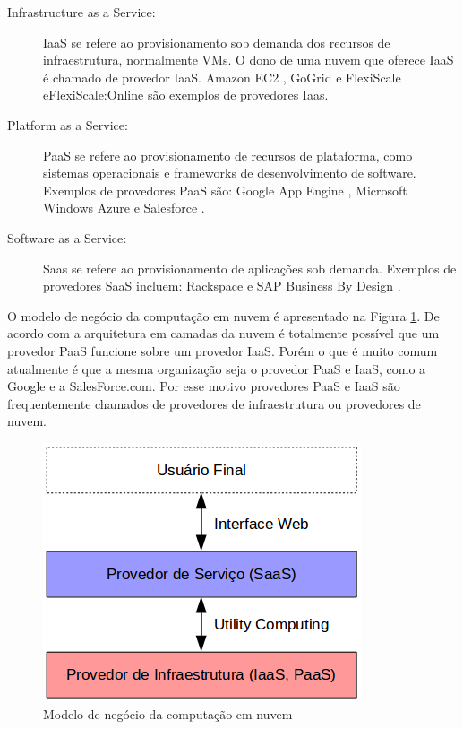 \begin{description}

\item[Infrastructure as a Service:] IaaS se refere ao provisionamento sob demanda dos recursos de infraestrutura, normalmente VMs. O dono de uma nuvem que oferece IaaS é chamado de provedor IaaS. Amazon EC2 \cite{AmazonEC2:Online}, GoGrid \cite{GoGrid:Online} e FlexiScale \citep{Aguiar:2005}e{FlexiScale:Online} são exemplos de provedores Iaas.

\item [Platform as a Service:] PaaS se refere ao provisionamento de recursos de plataforma, como sistemas operacionais e frameworks de desenvolvimento de software. Exemplos de provedores PaaS são: Google App Engine \cite{GoogleAppEngine:Online}, Microsoft Windows Azure \cite{MicrosoftAzure:Online} e Salesforce \cite{Salesforce:Online}.

\item[Software as a Service:] Saas se refere ao provisionamento de aplicações sob demanda. Exemplos de provedores SaaS incluem: Rackspace \cite{Rackspace:Online} e SAP Business By Design \cite{SAP:Online}.

\end{description}

O modelo de negócio da computação em nuvem é apresentado na Figura \ref{business-model}. De acordo com a arquitetura em camadas da nuvem é totalmente possível que um provedor PaaS funcione sobre um provedor IaaS. Porém o que é muito comum atualmente é que a mesma organização seja o provedor PaaS e IaaS, como a Google e a SalesForce.com. Por esse motivo provedores PaaS e IaaS são frequentemente chamados de provedores de infraestrutura ou provedores de nuvem.

\begin{figure}[htbp]
  \centering \includegraphics[scale=.6]{imgs/business-model.png}
\caption{Modelo de negócio da computação em nuvem} 
\label{business-model}
\end{figure}


